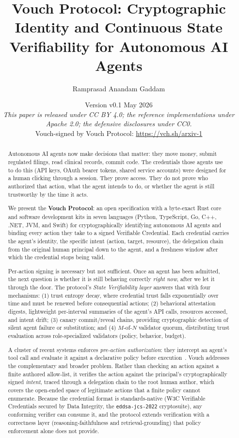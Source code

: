 \documentclass[11pt,a4paper]{article}
\title{
    Vouch Protocol: Cryptographic Identity and Continuous State Verifiability for Autonomous AI Agents
}
\author[1]{Ramprasad Anandam Gaddam}
\affil[1]{Independent (open-source maintainer, Vouch Protocol). \\
\texttt{ram@vouch-protocol.com} \\
\url{https://github.com/vouch-protocol/vouch}}
\date{Version v0.1 \quad May 2026 \\
\emph{This paper is released under CC BY 4.0; the reference implementations under Apache 2.0; the defensive disclosures under CC0.} \\[4pt]
\small Vouch-signed by Vouch Protocol: \url{https://vch.sh/arxiv-1}}
\begin{document}
\maketitle

\begin{abstract}
Autonomous AI agents now make decisions that matter: they move money, submit regulated filings, read clinical records, commit code. The credentials those agents use to do this (API keys, OAuth bearer tokens, shared service accounts) were designed for a human clicking through a session. They prove access. They do not prove who authorized that action, what the agent intends to do, or whether the agent is still trustworthy by the time it acts.

We present the \textbf{Vouch Protocol}: an open specification with a byte-exact Rust core and software development kits in seven languages (Python, TypeScript, Go, C++, .NET, JVM, and Swift) for cryptographically identifying autonomous AI agents and binding every action they take to a signed Verifiable Credential. Each credential carries the agent's identity, the specific intent (action, target, resource), the delegation chain from the original human principal down to the agent, and a freshness window after which the credential stops being valid.

Per-action signing is necessary but not sufficient. Once an agent has been admitted, the next question is whether it is still behaving correctly \emph{right now}, after we let it through the door. The protocol's \emph{State Verifiability layer} answers that with four mechanisms: (1) trust entropy decay, where credential trust falls exponentially over time and must be renewed before consequential actions; (2) behavioral attestation digests, lightweight per-interval summaries of the agent's API calls, resources accessed, and intent drift; (3) canary commit/reveal chains, providing cryptographic detection of silent agent failure or substitution; and (4) $M$-of-$N$ validator quorum, distributing trust evaluation across role-specialized validators (policy, behavior, budget).

A cluster of recent systems enforces \emph{pre-action authorization}: they intercept an agent's tool call and evaluate it against a declarative policy before execution~\cite{oap2026,faramesh2026,aarm2026,righttoact2026,forge2026}. Vouch addresses the complementary and broader problem. Rather than checking an action against a finite authored allow-list, it verifies the action against the principal's cryptographically signed \emph{intent}, traced through a delegation chain to the root human author, which covers the open-ended space of legitimate actions that a finite policy cannot enumerate. Because the credential format is standards-native (W3C Verifiable Credentials secured by Data Integrity, the \texttt{eddsa-jcs-2022} cryptosuite), any conforming verifier can consume it, and the protocol extends verification with a correctness layer (reasoning-faithfulness and retrieval-grounding) that policy enforcement alone does not provide.


\end{abstract}
\end{document}
